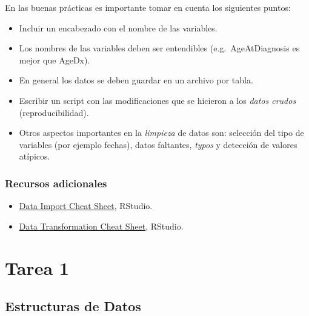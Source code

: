 \documentclass[
]{book}
\begin{document}
En las buenas prácticas es importante tomar en cuenta los siguientes puntos:

\begin{itemize}
\item
  Incluir un encabezado con el nombre de las variables.
\item
  Los nombres de las variables deben ser entendibles (e.g.~AgeAtDiagnosis es
  mejor que AgeDx).
\item
  En general los datos se deben guardar en un archivo por tabla.
\item
  Escribir un script con las modificaciones que se hicieron a los \emph{datos crudos}
  (reproducibilidad).
\item
  Otros aspectos importantes en la \emph{limpieza} de datos son: selección del tipo
  de variables (por ejemplo fechas), datos faltantes, \emph{typos} y detección de
  valores atípicos.
\end{itemize}

\hypertarget{recursos-adicionales}{%
\subsection*{Recursos adicionales}\label{recursos-adicionales}}

\begin{itemize}
\item
  \href{https://github.com/rstudio/cheatsheets/raw/master/data-import.pdf}{Data Import Cheat Sheet},
  RStudio.
\item
  \href{https://github.com/rstudio/cheatsheets/raw/master/data-transformation.pdf}{Data Transformation Cheat Sheet},
  RStudio.
\end{itemize}

\hypertarget{tarea-1}{%
\chapter{Tarea 1}\label{tarea-1}}

\hypertarget{estructuras-de-datos}{%
\section{Estructuras de Datos}\label{estructuras-de-datos}}
\end{document}
